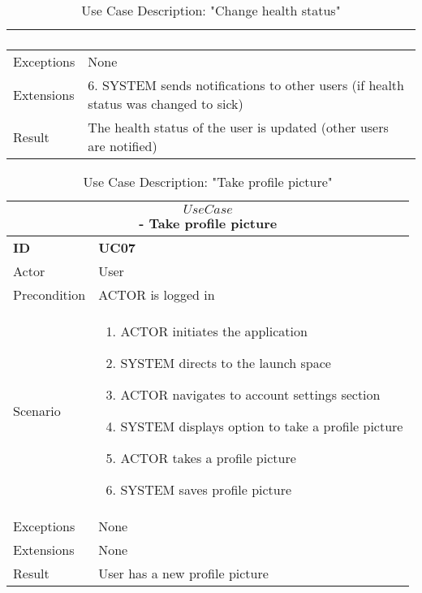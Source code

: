 \begin{center}
\begin{table}[H]
\begin{tabular}{ |p{2cm}||p{11cm}| }
\begin{enumerate}
            \end{enumerate}
            \\ \hline 
            Exceptions & None \\ \hline
            Extensions & 6. SYSTEM sends notifications to other users (if health status was changed to sick) \\ \hline
            Result & The health status of the user is updated (other users are notified) \\ \hline
        \end{tabular}
        \caption{Use Case Description: "Change health status"}
    \end{table}
    
    \vspace{5mm}
    \begin{table}[H]
        \begin{tabular}{ |p{2cm}||p{11cm}| }
            \hline
            \multicolumn{2}{|c|}{$$Use Case$$ - Take profile picture} \\ \hline
            \textbf{ID} & \textbf{UC07} \\ \hline
            Actor & User \\ \hline
            Precondition & ACTOR is logged in \\ \hline
            Scenario &
            \begin{enumerate}
                \item ACTOR initiates the application
                \item SYSTEM directs to the launch space
                \item ACTOR navigates to account settings section
                \item SYSTEM displays option to take a profile picture
                \item ACTOR takes a profile picture
                \item SYSTEM saves profile picture
            \end{enumerate}
            \\ \hline 
            Exceptions & None \\ \hline
            Extensions & None \\ \hline
            Result & User has a new profile picture \\ \hline
        \end{tabular}
        \caption{Use Case Description: "Take profile picture"}
    \end{table}
    

\end{center}
